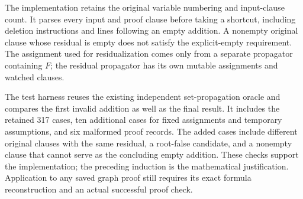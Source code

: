 \documentclass[11pt]{article}
\begin{document}
The implementation retains the original variable numbering and input-clause
count. It parses every input and proof clause before taking a shortcut,
including deletion instructions and lines following an empty addition.
A nonempty original clause whose residual is empty does not satisfy the
explicit-empty requirement. The assignment used for residualization comes
only from a separate propagator containing $F$; the residual propagator has
its own mutable assignments and watched clauses.

The test harness reuses the existing independent set-propagation oracle and
compares the first invalid addition as well as the final result. It includes
the retained 317 cases, ten additional cases for fixed assignments and
temporary assumptions, and six malformed proof records. The added cases
include different original clauses with the same residual, a root-false
candidate, and a nonempty clause that cannot serve as the concluding empty
addition. These checks support the implementation; the preceding induction
is the mathematical justification. Application to any saved graph proof
still requires its exact formula reconstruction and an actual successful
proof check.
\end{document}
